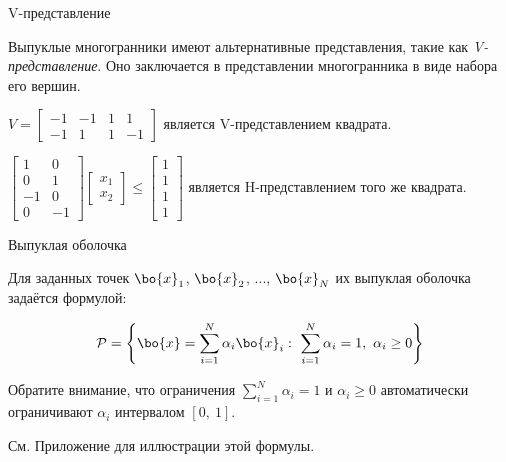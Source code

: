 \documentclass{beamer}
\begin{document}
\begin{frame}{V-представление}
	\begin{flushleft}
		
		Выпуклые многогранники имеют альтернативные представления, такие как \emph{V-представление}. Оно заключается в представлении многогранника в виде набора его вершин.
		
		\begin{example}
			$V = \begin{bmatrix} -1 & -1 & 1 & 1 \\ -1 & 1 & 1 & -1 \end{bmatrix}$ является V-представлением квадрата.
		\end{example}
		
		\begin{example}
			$\begin{bmatrix} 1 & 0 \\ 0 & 1 \\ -1 & 0 \\ 0 & -1 \end{bmatrix}
			\begin{bmatrix} x_1 \\ x_2 \end{bmatrix} \leq
			\begin{bmatrix} 1 \\ 1 \\ 1 \\ 1 \end{bmatrix}$
			является H-представлением того же квадрата.
		\end{example}
		
	\end{flushleft}
\end{frame}


\begin{frame}{Выпуклая оболочка}
	\begin{flushleft}
		
		Для заданных точек $\bo{x}_1$, $\bo{x}_2$, ..., $\bo{x}_N$ их выпуклая оболочка задаётся формулой:
		
		\begin{equation}
			\mathcal{P} = \left \{  \bo{x} = \sum_{i=1}^{N} \alpha_i\bo{x}_i: \   \sum_{i=1}^{N} \alpha_i = 1, \  \alpha_i \geq 0 \right \}
		\end{equation}
		
		
		\bigskip
		
		Обратите внимание, что ограничения $\sum_{i=1}^{N} \alpha_i = 1$ и $\alpha_i \geq 0$ автоматически ограничивают $\alpha_i$ интервалом $[0, \ 1]$.
		
		\bigskip
		
		См. Приложение для иллюстрации этой формулы.
		
	\end{flushleft}
\end{frame}
\end{document}
